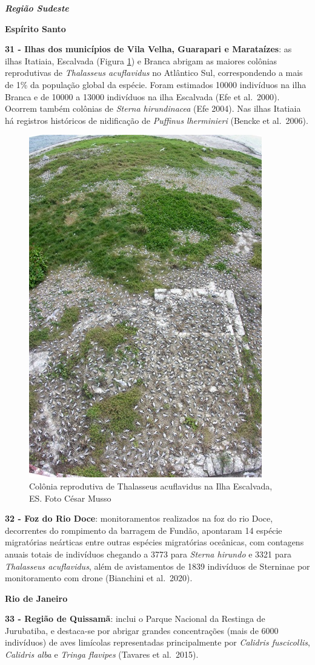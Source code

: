 \documentclass[
  oneside]{scrbook}
\begin{document}
\textbf{\emph{Região Sudeste}}

\textbf{Espírito Santo}

\textbf{31 - Ilhas dos municípios de Vila Velha, Guarapari e Marataízes}: as ilhas Itatiaia, Escalvada (Figura \ref{fig:25}) e Branca abrigam as maiores colônias reprodutivas de \emph{Thalasseus acuflavidus} no Atlântico Sul, correspondendo a mais de 1\% da população global da espécie. Foram estimados 10000 indivíduos na ilha Branca e de 10000 a 13000 indivíduos na ilha Escalvada (Efe et al.~2000). Ocorrem também colônias de \emph{Sterna hirundinacea} (Efe 2004). Nas ilhas Itatiaia há registros históricos de nidificação de \emph{Puffinus lherminieri} (Bencke et al.~2006).

\begin{figure}[H]

{\centering \includegraphics[width=0.4\linewidth]{imagens/cap07/Figura_7.5} 

}

\caption{Colônia reprodutiva de Thalasseus acuflavidus na Ilha Escalvada, ES. Foto César Musso}\label{fig:25}
\end{figure}

\textbf{32 - Foz do Rio Doce}: monitoramentos realizados na foz do rio Doce, decorrentes do rompimento da barragem de Fundão, apontaram 14 espécie migratórias neárticas entre outras espécies migratórias oceânicas, com contagens anuais totais de indivíduos chegando a 3773 para \emph{Sterna hirundo} e 3321 para \emph{Thalasseus acuflavidus}, além de avistamentos de 1839 indivíduos de Sterninae por monitoramento com drone (Bianchini et al.~2020).

\textbf{Rio de Janeiro}

\textbf{33 - Região de Quissamã}: inclui o Parque Nacional da Restinga de Jurubatiba, e destaca-se por abrigar grandes concentrações (mais de 6000 indivíduos) de aves limícolas representadas principalmente por \emph{Calidris fuscicollis}, \emph{Calidris alba} e \emph{Tringa flavipes} (Tavares et al.~2015).
\end{document}
